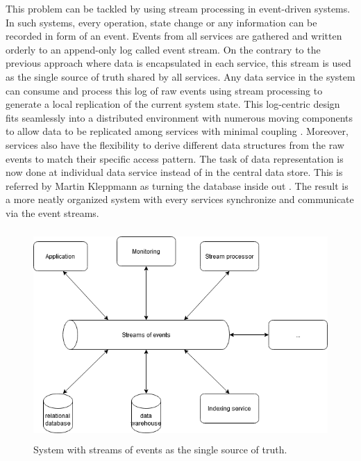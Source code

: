 This problem can be tackled by using stream processing in event-driven systems. In such systems, every operation, state change or any information can be recorded in form of an event. Events from all services are gathered and written orderly to an append-only log called event stream. On the contrary to the previous approach where data is encapsulated in each service, this stream is used as the single source of truth shared by all services. Any data service in the system can consume and process this log of raw events using stream processing to generate a local replication of the current system state. This log-centric design fits seamlessly into a distributed environment with numerous moving components to allow data to be replicated among services with minimal coupling \cite{logjaykreps}. Moreover, services also have the flexibility to derive different data structures from the raw events to match their specific access pattern. The task of data representation is now done at individual data service instead of in the central data store. This is referred by Martin Kleppmann as turning the database inside out \cite{kleppmann2016making}. The result is a more neatly organized system with every services synchronize and communicate via the event streams.

\begin{figure}[h]
	\includegraphics[width=\linewidth,height=8cm]{images/eventstreamprocessing.png}
	\caption{System with streams of events as the single source of truth.}
	\label{fig:eventstreamprocessingsystem}
\end{figure}

